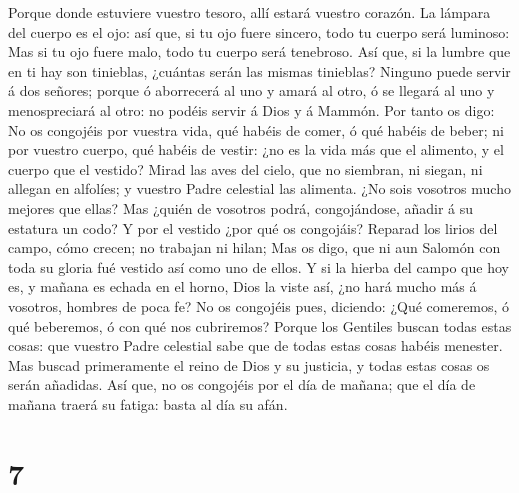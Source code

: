 Porque donde estuviere vuestro tesoro, allí estará vuestro corazón.
 La lámpara del cuerpo es el ojo: así que, si tu ojo
fuere sincero, todo tu cuerpo será luminoso:  Mas si tu
ojo fuere malo, todo tu cuerpo será tenebroso. Así que, si la lumbre que
en ti hay son tinieblas, ¿cuántas serán las mismas tinieblas?
 Ninguno puede servir á dos señores; porque ó aborrecerá
al uno y amará al otro, ó se llegará al uno y menospreciará al otro: no
podéis servir á Dios y á Mammón.  Por tanto os digo: No
os congojéis por vuestra vida, qué habéis de comer, ó qué habéis de
beber; ni por vuestro cuerpo, qué habéis de vestir: ¿no es la vida más
que el alimento, y el cuerpo que el vestido?  Mirad las
aves del cielo, que no siembran, ni siegan, ni allegan en alfolíes; y
vuestro Padre celestial las alimenta. ¿No sois vosotros mucho mejores
que ellas?  Mas ¿quién de vosotros podrá, congojándose,
añadir á su estatura un codo?  Y por el vestido ¿por qué
os congojáis? Reparad los lirios del campo, cómo crecen; no trabajan ni
hilan;  Mas os digo, que ni aun Salomón con toda su
gloria fué vestido así como uno de ellos.  Y si la hierba
del campo que hoy es, y mañana es echada en el horno, Dios la viste así,
¿no hará mucho más á vosotros, hombres de poca fe?  No os
congojéis pues, diciendo: ¿Qué comeremos, ó qué beberemos, ó con qué nos
cubriremos?  Porque los Gentiles buscan todas estas
cosas: que vuestro Padre celestial sabe que de todas estas cosas habéis
menester.  Mas buscad primeramente el reino de Dios y su
justicia, y todas estas cosas os serán añadidas.  Así
que, no os congojéis por el día de mañana; que el día de mañana traerá
su fatiga: basta al día su afán.

\hypertarget{section-6}{%
\section{7}\label{section-6}}

